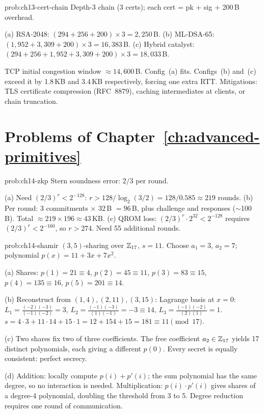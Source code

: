 \begin{sol}{prob:ch13-cert-chain}
Depth-3 chain (3 certs); each cert = pk + sig + 200\,B overhead.

(a) RSA-2048: $(294+256+200)\times 3 = 2{,}250$\,B.
(b) ML-DSA-65: $(1{,}952+3{,}309+200)\times 3 = 16{,}383$\,B.
(c) Hybrid catalyst: $(294+256+1{,}952+3{,}309+200)\times 3 = 18{,}033$\,B.

TCP initial congestion window $\approx 14{,}600$\,B.  Config~(a) fits.  Configs~(b) and~(c) exceed it by 1.8\,KB and 3.4\,KB respectively, forcing one extra RTT.  Mitigations: TLS certificate compression (RFC~8879), caching intermediates at clients, or chain truncation.
\end{sol}

\section*{Problems of Chapter~\ref{ch:advanced-primitives}}

\begin{sol}{prob:ch14-zkp}
Stern soundness error: $2/3$ per round.

(a) Need $(2/3)^r<2^{-128}$: $r>128/\log_2(3/2)=128/0.585\approx 219$ rounds.
(b) Per round: 3 commitments $\times$ 32\,B $=96$\,B, plus challenge and responses ($\sim$100\,B).  Total $\approx 219\times 196\approx 43$\,KB.
(c) QROM loss: $(2/3)^r\cdot 2^{32}<2^{-128}$ requires $(2/3)^r<2^{-160}$, so $r>274$.  Need 55 additional rounds.
\end{sol}

\begin{sol}{prob:ch14-shamir}
$(3,5)$-sharing over $\mathbb{Z}_{17}$, $s=11$.  Choose $a_1=3$, $a_2=7$; polynomial $p(x)=11+3x+7x^2$.

(a) Shares: $p(1)=21\equiv 4$, $p(2)=45\equiv 11$, $p(3)=83\equiv 15$, $p(4)=135\equiv 16$, $p(5)=201\equiv 14$.

(b) Reconstruct from $(1,4),(2,11),(3,15)$: Lagrange basis at $x=0$:
$L_1=\frac{(-2)(-3)}{(-1)(-2)}=3$, $L_2=\frac{(-1)(-3)}{(1)(-1)}=-3\equiv 14$, $L_3=\frac{(-1)(-2)}{(2)(1)}=1$.
$s=4\cdot 3+11\cdot 14+15\cdot 1 = 12+154+15=181\equiv 11\pmod{17}$.\;\checkmark

(c) Two shares fix two of three coefficients.  The free coefficient $a_2\in\mathbb{Z}_{17}$ yields 17 distinct polynomials, each giving a different $p(0)$.  Every secret is equally consistent: perfect secrecy.

(d) Addition: locally compute $p(i)+p'(i)$; the sum polynomial has the same degree, so no interaction is needed.  Multiplication: $p(i)\cdot p'(i)$ gives shares of a degree-4 polynomial, doubling the threshold from 3 to 5.  Degree reduction requires one round of communication.
\end{sol}

